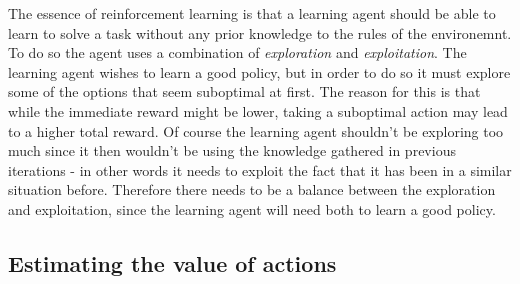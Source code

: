\documentclass[11pt]{article}
\begin{document}
The essence of reinforcement learning is that a learning agent should be able to learn
to solve a task without any prior knowledge to the rules of the environemnt.
To do so the agent uses a combination of \textit{exploration} and \textit{exploitation}.
The learning agent wishes to learn a good policy, but in order to do so it must explore
some of the options that seem suboptimal at first.
The reason for this is that while the immediate reward might be lower, taking a
suboptimal action may lead to a higher total reward.
Of course the learning agent shouldn't be exploring too much since it then wouldn't
be using the knowledge gathered in previous iterations - in other words it needs to
exploit the fact that it has been in a similar situation before.
Therefore there needs to be a balance between the exploration and exploitation, since
the learning agent will need both to learn a good policy.

\subsection{Estimating the value of actions}



%

%
\end{document}
